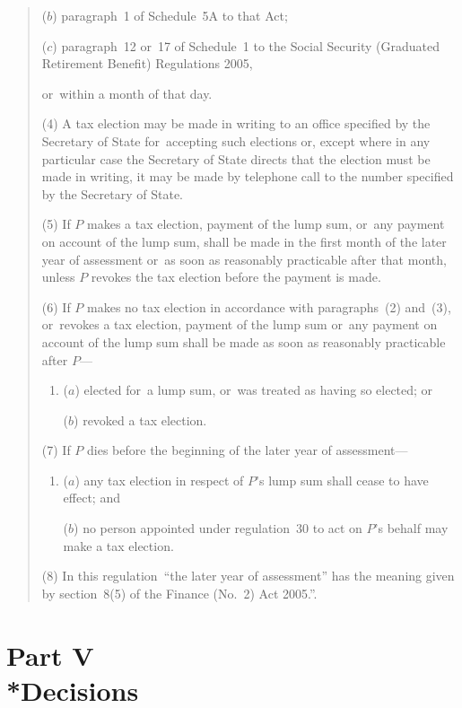 \documentclass[12pt,a4paper]{article}
\begin{document}
\begin{quotation}
\begin{enumerate}
($b$) paragraph~1 of Schedule~5A to that Act;

($c$) paragraph~12 or~17 of Schedule~1 to the Social Security (Graduated Retirement Benefit) Regulations 2005,
\end{enumerate}
or~within a month of that day.

(4) A tax election may be made in writing to an office specified by the Secretary of State for~accepting such elections or, except where in any particular case the Secretary of State directs that the election must be made in writing, it may be made by telephone call to the number specified by the Secretary of State.

(5) If $P$ makes a tax election, payment of the lump sum, or~any payment on account of the lump sum, shall be made in the first month of the later year of assessment or~as soon as reasonably practicable after that month, unless $P$ revokes the tax election before the payment is made.

(6) If $P$ makes no tax election in accordance with paragraphs~(2) and~(3), or~revokes a tax election, payment of the lump sum or~any payment on account of the lump sum shall be made as soon as reasonably practicable after $P$—
\begin{enumerate}\item[]
($a$) elected for~a lump sum, or~was treated as having so elected; or

($b$) revoked a tax election.
\end{enumerate}

(7) If $P$ dies before the beginning of the later year of assessment—
\begin{enumerate}\item[]
($a$) any tax election in respect of $P$’s lump sum shall cease to have effect; and

($b$) no person appointed under regulation~30 to act on $P$’s behalf may make a tax election.
\end{enumerate}

(8) In this regulation~“the later year of assessment” has the meaning given by section~8(5) of the Finance (No.~2) Act 2005.”.
\end{quotation}

\section[Part V --- Decisions]{Part V\\*Decisions}

\renewcommand\parthead{--- Part V}
\end{document}
